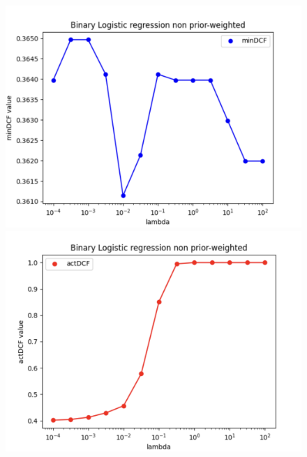 \documentclass{article}
\begin{document}
\begin{figure}[H]
    \centering
    \begin{minipage}{.27\textwidth}
        \centering
        \includegraphics[width=\linewidth]{./img/LLR_noW1.png}
    \end{minipage}%
    \begin{minipage}{.27\textwidth}
        \centering
        \includegraphics[width=\linewidth]{./img/LLR_noW2.png}
    \end{minipage}%
    \begin{minipage}{.27\textwidth}
        \centering

\end{minipage}
\end{figure}
\end{document}

